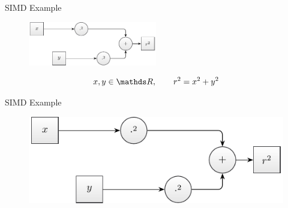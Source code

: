 \documentclass[aspectratio=169]{beamer}
\begin{document}

    \begin{frame}{SIMD Example}
      \begin{figure}
        \includegraphics[width=0.5\textwidth]{figures/radius_operation.pdf}
      \end{figure}
      \begin{mybox}
        \[
          x,y\in\setReal, \qquad r^2 = x^2 + y^2
        \]
      \end{mybox}
    \end{frame}

    \begin{frame}{SIMD Example}
      \begin{figure}
        \includegraphics[scale=0.9]{figures/radius_operation.pdf}
      \end{figure}
    \end{frame}
\end{document}
